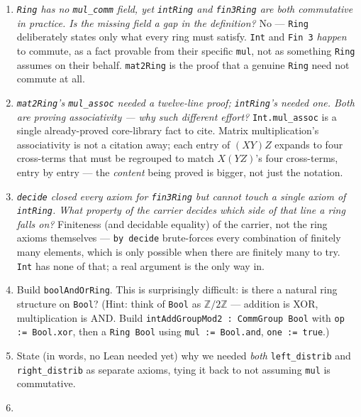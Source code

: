 \begin{enumerate}
\def\labelenumi{\arabic{enumi}.}
\item
  \emph{\texttt{Ring} has no \texttt{mul\_\allowbreak{}comm} field, yet \texttt{intRing} and \texttt{fin3Ring} are both commutative in practice. Is the missing field a gap in the definition?} No --- \texttt{Ring} deliberately states only what every ring must satisfy. \texttt{Int} and \texttt{Fin 3} \emph{happen} to commute, as a fact provable from their specific \texttt{mul}, not as something \texttt{Ring} assumes on their behalf. \texttt{mat2Ring} is the proof that a genuine \texttt{Ring} need not commute at all.
\item
  \emph{\texttt{mat2Ring}'s \texttt{mul\_\allowbreak{}assoc} needed a twelve-line proof; \texttt{intRing}'s needed one. Both are proving associativity --- why such different effort?} \texttt{Int.mul\_\allowbreak{}assoc} is a single already-proved core-library fact to cite. Matrix multiplication's associativity is not a citation away; each entry of \((XY)Z\) expands to four cross-terms that must be regrouped to match \(X(YZ)\)'s four cross-terms, entry by entry --- the \emph{content} being proved is bigger, not just the notation.
\item
  \emph{\texttt{decide} closed every axiom for \texttt{fin3Ring} but cannot touch a single axiom of \texttt{intRing}. What property of the carrier decides which side of that line a ring falls on?} Finiteness (and decidable equality) of the carrier, not the ring axioms themselves --- \texttt{by decide} brute-forces every combination of finitely many elements, which is only possible when there are finitely many to try. \texttt{Int} has none of that; a real argument is the only way in.
\item
  Build \texttt{boolAndOrRing}. This is surprisingly difficult: is there a natural ring structure on \texttt{Bool}? (Hint: think of \texttt{Bool} as \(\mathbb{Z}/2\mathbb{Z}\) --- addition is XOR, multiplication is AND. Build \texttt{intAddGroupMod2 : CommGroup Bool} with \texttt{op := Bool.xor}, then a \texttt{Ring Bool} using \texttt{mul := Bool.and}, \texttt{one := true}.)
\item
  State (in words, no Lean needed yet) why we needed \emph{both} \texttt{left\_\allowbreak{}distrib} and \texttt{right\_\allowbreak{}distrib} as separate axioms, tying it back to not assuming \texttt{mul} is commutative.
\item

\end{enumerate}
